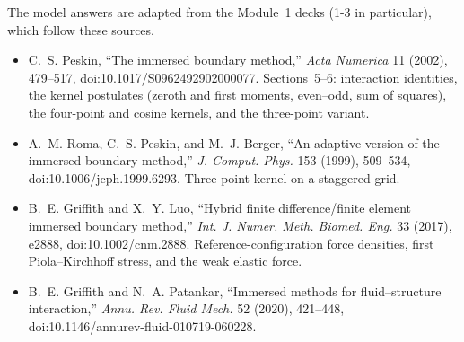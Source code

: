 \documentclass[11pt]{article}
\begin{document}
The model answers are adapted from the Module~1 decks (1-3 in particular),
which follow these sources.
\begin{itemize}
\item C.~S. Peskin, ``The immersed boundary method,'' \emph{Acta Numerica} 11
  (2002), 479--517, doi:10.1017/S0962492902000077. Sections~5--6: interaction
  identities, the kernel postulates (zeroth and first moments, even--odd,
  sum of squares), the four-point and cosine kernels, and the three-point
  variant.
\item A.~M. Roma, C.~S. Peskin, and M.~J. Berger, ``An adaptive version of the
  immersed boundary method,'' \emph{J. Comput. Phys.} 153 (1999), 509--534,
  doi:10.1006/jcph.1999.6293. Three-point kernel on a staggered grid.
\item B.~E. Griffith and X.~Y. Luo, ``Hybrid finite difference/finite element
  immersed boundary method,'' \emph{Int. J. Numer. Meth. Biomed. Eng.} 33
  (2017), e2888, doi:10.1002/cnm.2888. Reference-configuration force densities,
  first Piola--Kirchhoff stress, and the weak elastic force.
\item B.~E. Griffith and N.~A. Patankar, ``Immersed methods for
  fluid--structure interaction,'' \emph{Annu. Rev. Fluid Mech.} 52 (2020),
  421--448, doi:10.1146/annurev-fluid-010719-060228.
\end{itemize}
\end{document}
